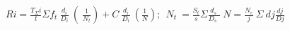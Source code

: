 \(Ri=\frac{T_{\Sigma}i}{t}\Sigma f_t\ \frac{d_i}{D_i}\ \left(\ \frac{1}{N_t}\right)+C\ \frac{d_i}{D_i}\ \left(\frac{1}{N}\right);\ \ N_t\ =\frac{S_t}{s}\Sigma\frac{d_s\ }{D_s\ \ }\ N=\frac{N_c}{j}\ \Sigma\ dj\frac{dj}{Dj}\)